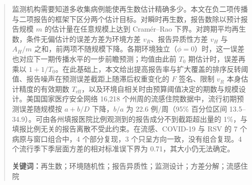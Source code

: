 \begin{abstract}
\noindent 监测机构需要知道多收集病例能使再生数估计精确多少。本文在负二项传播与二项报告的框架下区分两个估计目标。对瞬时再生数，报告数除以预计报告规模 $m$ 的估计量在任意规模上达到 Cramér--Rao 下界。对跨期平均再生数，条件无偏估计的误差方差为环境方差 $v_R$、报告异质性方差 $v_H$ 与 $A_H/m$ 之和，前两项不随规模下降。各期环境独立（$\phi=0$）时，这一误差也对应下一期传播水平的一步前瞻预测；均值由此前 $T_0$ 期估计时，误差再乘以 $1+1/T_0$。在此基础上，本文给出提高报告率与扩大覆盖的排序反转阈值、报告噪声在预测误差截距上随滞后权重变化的 $F$ 签名、限制 $v_R$ 本身估计精度的有效期数 $T_{\mathrm{eff}}$，以及环境自相关时由预算阈值决定的期数与规模设计。美国国家医疗安全网络 16,218 个州周的流感住院数据中，流行初期预测误差随规模按 $a+b/D$ 下降，$b/a$ 为 22.6 例/周（95\% 百分位区间 13.5--34.9）。可由各州填报医院比例观测到的报告成分不到截距超出量的 1\%，与填报比例无关的报告离散不受此约束。在流感、COVID-19 与 RSV 的 7 个病原与窗口组合中，4 个部分复现，3 个只呈方向一致，没有组合复现。4 个流行季下季层面方差的相对标准误下界为 0.71，其大小仍无法确定。

\vspace{0.6em}
\noindent\textbf{关键词：}再生数；环境随机性；报告异质性；监测设计；方差分解；流感住院
\end{abstract}

